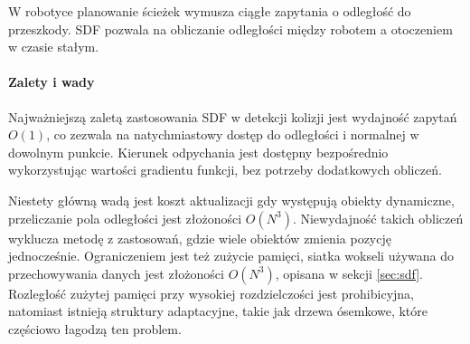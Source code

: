 W robotyce planowanie ścieżek wymusza ciągłe zapytania o odległość do przeszkody. SDF pozwala na obliczanie odległości między robotem a otoczeniem w czasie stałym.

\paragraph{Zalety i wady}
Najważniejszą zaletą zastosowania SDF w detekcji kolizji jest wydajność zapytań $O(1)$, co zezwala na natychmiastowy dostęp do odległości i normalnej w dowolnym punkcie. Kierunek odpychania jest dostępny bezpośrednio wykorzystując wartości gradientu funkcji, bez potrzeby dodatkowych obliczeń.

Niestety główną wadą jest koszt aktualizacji gdy występują obiekty dynamiczne, przeliczanie pola odległości jest złożoności $O(N^3)$. Niewydajność takich obliczeń wyklucza metodę z zastosowań, gdzie wiele obiektów zmienia pozycję jednocześnie. Ograniczeniem jest też zużycie pamięci, siatka wokseli używana do przechowywania danych jest złożoności $O(N^3)$, opisana w sekcji \ref{sec:sdf}. Rozległość zużytej pamięci przy wysokiej rozdzielczości jest prohibicyjna, natomiast istnieją struktury adaptacyjne, takie jak drzewa ósemkowe, które częściowo łagodzą ten problem.